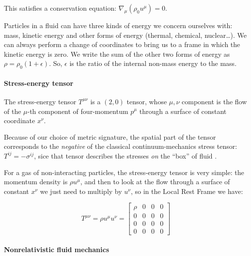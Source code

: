 \documentclass[main.tex]{subfiles}
\begin{document}
This satisfies a conservation equation: $\nabla_\mu(\rho_0 u^\mu) = 0$.

Particles in a fluid can have three kinds of energy we concern ourselves with: mass, kinetic energy and other forms of energy (thermal, chemical, nuclear\dots).
We can always perform a change of coordinates to bring us to a frame in which the kinetic energy is zero. We write the sum of the other two forms of energy as $\rho = \rho_0 (1+\epsilon)$. So, $\epsilon$ is the ratio of the internal non-mass energy to the mass.

\paragraph{Stress-energy tensor}

The stress-energy tensor \(T^{\mu\nu}\) is a \((2,0)\) tensor, whose \(\mu, \nu\) component is the flow of the \(\mu\)-th component of four-momentum \(p^\mu\) through a surface of constant coordinate \(x^\nu\).

Because of our choice of metric signature, the spatial part of the tensor corresponds to the \emph{negative} of the classical continuum-mechanics stress tensor: \(T^{ij} = - \sigma^{ij}\), sice that tensor describes the stresses \emph{on} the ``box'' of fluid \cite[]{Moretti:2016}.

For a gas of non-interacting particles, the stress-energy tensor is very simple: the momentum density is \(\rho u^\mu\), and then to look at the flow through a surface of constant \(x^\nu\) we just need to multiply by \(u^\nu\), so in the Local Rest Frame we have:

\begin{equation}
    T^{\mu\nu} = \rho u^\mu u^\nu = \begin{bmatrix}
    \rho    & 0  &  0 & 0 \\
      0 & 0  & 0  & 0 \\
      0 & 0  & 0  & 0 \\
      0 & 0  & 0  & 0
    \end{bmatrix}
\end{equation}

%

\paragraph{Nonrelativistic fluid mechanics}
\end{document}
